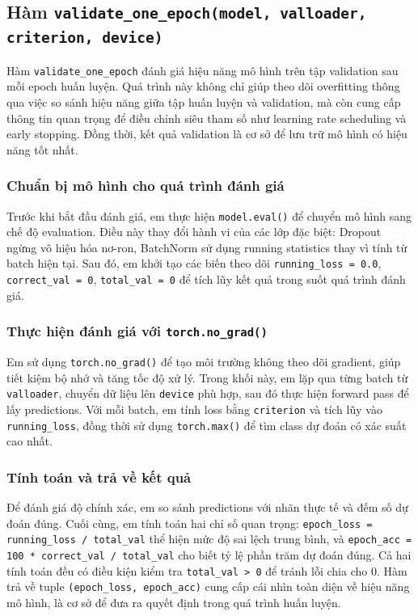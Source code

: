 \documentclass[12pt, a4paper, openany]{report}
\begin{document}
\subsection{Hàm \texttt{validate\_one\_epoch(model, valloader, criterion, device)}}
Hàm \texttt{validate\_one\_epoch} đánh giá hiệu năng mô hình trên tập validation sau mỗi epoch huấn luyện. Quá trình này không chỉ giúp theo dõi overfitting thông qua việc so sánh hiệu năng giữa tập huấn luyện và validation, mà còn cung cấp thông tin quan trọng để điều chỉnh siêu tham số như learning rate scheduling và early stopping. Đồng thời, kết quả validation là cơ sở để lưu trữ mô hình có hiệu năng tốt nhất.

\subsubsection*{Chuẩn bị mô hình cho quá trình đánh giá}
Trước khi bắt đầu đánh giá, em thực hiện \texttt{model.eval()} để chuyển mô hình sang chế độ evaluation. Điều này thay đổi hành vi của các lớp đặc biệt: Dropout ngừng vô hiệu hóa nơ-ron, BatchNorm sử dụng running statistics thay vì tính từ batch hiện tại. Sau đó, em khởi tạo các biến theo dõi \texttt{running\_loss = 0.0}, \texttt{correct\_val = 0}, \texttt{total\_val = 0} để tích lũy kết quả trong suốt quá trình đánh giá.

\subsubsection*{Thực hiện đánh giá với \texttt{torch.no\_grad()}}
Em sử dụng \texttt{torch.no\_grad()} để tạo môi trường không theo dõi gradient, giúp tiết kiệm bộ nhớ và tăng tốc độ xử lý. Trong khối này, em lặp qua từng batch từ \texttt{valloader}, chuyển dữ liệu lên \texttt{device} phù hợp, sau đó thực hiện forward pass để lấy predictions. Với mỗi batch, em tính loss bằng \texttt{criterion} và tích lũy vào \texttt{running\_loss}, đồng thời sử dụng \texttt{torch.max()} để tìm class dự đoán có xác suất cao nhất.

\subsubsection*{Tính toán và trả về kết quả}
Để đánh giá độ chính xác, em so sánh predictions với nhãn thực tế và đếm số dự đoán đúng. Cuối cùng, em tính toán hai chỉ số quan trọng: \texttt{epoch\_loss = running\_loss / total\_val} thể hiện mức độ sai lệch trung bình, và \texttt{epoch\_acc = 100 * correct\_val / total\_val} cho biết tỷ lệ phần trăm dự đoán đúng. Cả hai tính toán đều có điều kiện kiểm tra \texttt{total\_val > 0} để tránh lỗi chia cho 0. Hàm trả về tuple \texttt{(epoch\_loss, epoch\_acc)} cung cấp cái nhìn toàn diện về hiệu năng mô hình, là cơ sở để đưa ra quyết định trong quá trình huấn luyện.
\end{document}
